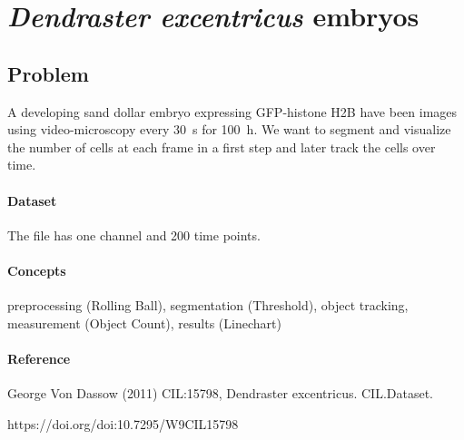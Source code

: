 \section{\textit{Dendraster excentricus} embryos}

\subsection*{Problem}
A developing sand dollar embryo expressing GFP-histone H2B have been images using video-microscopy every \SI{30}{\second} for \SI{100}{\hour}. We want to segment and visualize the number of cells at each frame in a first step and later track the cells over time.

\paragraph{Dataset} The file  has one channel and 200 time points.

\paragraph{Concepts} 
preprocessing (Rolling Ball), 
segmentation (Threshold), 
object tracking, 
measurement (Object Count), 
results (Linechart)

\paragraph{Reference} 
George Von Dassow (2011) CIL:15798, Dendraster excentricus. CIL.Dataset. 

https://doi.org/doi:10.7295/W9CIL15798



